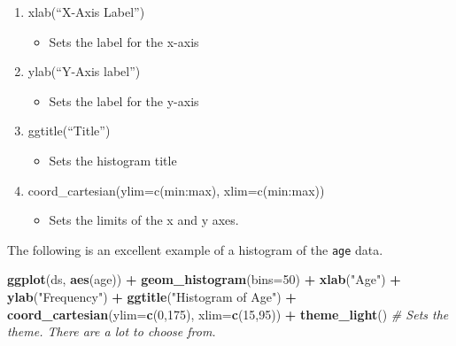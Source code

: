 \documentclass[]{article}
\newenvironment{Shaded}{\begin{snugshade}}{\end{snugshade}}
\newcommand{\KeywordTok}[1]{\textcolor[rgb]{0.13,0.29,0.53}{\textbf{#1}}}
\newcommand{\DataTypeTok}[1]{\textcolor[rgb]{0.13,0.29,0.53}{#1}}
\newcommand{\DecValTok}[1]{\textcolor[rgb]{0.00,0.00,0.81}{#1}}
\newcommand{\StringTok}[1]{\textcolor[rgb]{0.31,0.60,0.02}{#1}}
\newcommand{\CommentTok}[1]{\textcolor[rgb]{0.56,0.35,0.01}{\textit{#1}}}
\newcommand{\OperatorTok}[1]{\textcolor[rgb]{0.81,0.36,0.00}{\textbf{#1}}}
\newcommand{\NormalTok}[1]{#1}
\providecommand{\tightlist}{%
  \setlength{\itemsep}{0pt}\setlength{\parskip}{0pt}}
\begin{document}
\begin{enumerate}
\def\labelenumi{\arabic{enumi}.}
\tightlist
\item
  xlab(``X-Axis Label'')

  \begin{itemize}
  \tightlist
  \item
    Sets the label for the x-axis
  \end{itemize}
\item
  ylab(``Y-Axis label'')

  \begin{itemize}
  \tightlist
  \item
    Sets the label for the y-axis
  \end{itemize}
\item
  ggtitle(``Title'')

  \begin{itemize}
  \tightlist
  \item
    Sets the histogram title
  \end{itemize}
\item
  coord\_cartesian(ylim=c(min:max), xlim=c(min:max))

  \begin{itemize}
  \tightlist
  \item
    Sets the limits of the x and y axes.
  \end{itemize}
\end{enumerate}

The following is an excellent example of a histogram of the \texttt{age}
data.

\begin{Shaded}
\begin{Highlighting}[]
\KeywordTok{ggplot}\NormalTok{(ds, }\KeywordTok{aes}\NormalTok{(age)) }\OperatorTok{+}
\StringTok{  }\KeywordTok{geom_histogram}\NormalTok{(}\DataTypeTok{bins=}\DecValTok{50}\NormalTok{) }\OperatorTok{+}\StringTok{ }
\StringTok{  }\KeywordTok{xlab}\NormalTok{(}\StringTok{"Age"}\NormalTok{) }\OperatorTok{+}
\StringTok{  }\KeywordTok{ylab}\NormalTok{(}\StringTok{"Frequency"}\NormalTok{) }\OperatorTok{+}
\StringTok{  }\KeywordTok{ggtitle}\NormalTok{(}\StringTok{"Histogram of Age"}\NormalTok{) }\OperatorTok{+}
\StringTok{  }\KeywordTok{coord_cartesian}\NormalTok{(}\DataTypeTok{ylim=}\KeywordTok{c}\NormalTok{(}\DecValTok{0}\NormalTok{,}\DecValTok{175}\NormalTok{), }\DataTypeTok{xlim=}\KeywordTok{c}\NormalTok{(}\DecValTok{15}\NormalTok{,}\DecValTok{95}\NormalTok{)) }\OperatorTok{+}
\StringTok{  }\KeywordTok{theme_light}\NormalTok{() }\CommentTok{# Sets the theme. There are a lot to choose from.}
\end{Highlighting}
\end{Shaded}
\end{document}
